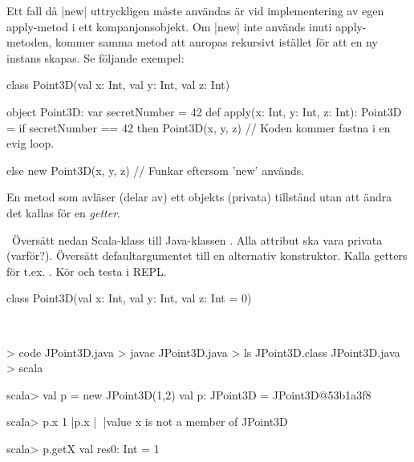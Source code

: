 Ett fall då \code|new| uttryckligen måste användas är vid implementering av egen apply-metod i ett kompanjonsobjekt. Om \code|new| inte används inuti apply-metoden, kommer samma metod att anropas rekursivt istället för att en ny instans skapas. Se följande exempel:

\begin{Code}
class Point3D(val x: Int, val y: Int, val z: Int)

object Point3D:
  var secretNumber = 42
  def apply(x: Int, y: Int, z: Int): Point3D =
    if secretNumber == 42 then
      Point3D(x, y, z) // Koden kommer fastna i en evig loop.

    else new Point3D(x, y, z) // Funkar eftersom 'new' används.
\end{Code}



\SubtaskSolved En metod som avläser (delar av) ett objekts (privata) tillstånd utan att ändra det kallas för en \emph{getter}.

\QUESTEND



\QUESTBEGIN

\Task \what~Översätt nedan Scala-klass till Java-klassen . Alla attribut ska vara privata (varför?). Översätt defaultargumentet till en alternativ konstruktor. Kalla getters för t.ex. . Kör  och testa i REPL.

\begin{Code}
class Point3D(val x: Int, val y: Int, val z: Int = 0)
\end{Code}

\SOLUTION

\TaskSolved \what~


\begin{REPL}
> code JPoint3D.java
> javac JPoint3D.java
> ls
JPoint3D.class  JPoint3D.java
> scala

scala> val p = new JPoint3D(1,2)
val p: JPoint3D = JPoint3D@53b1a3f8

scala> p.x
1 |p.x
  |^^^
  |value x is not a member of JPoint3D

scala> p.getX
val res0: Int = 1
\end{REPL}

\QUESTEND



